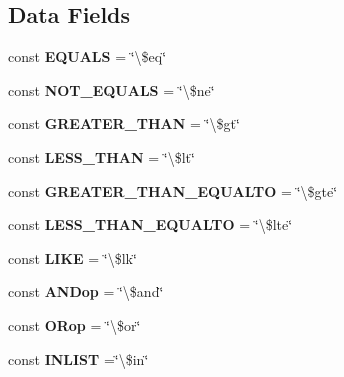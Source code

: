 \subsection*{Data Fields}
\begin{DoxyCompactItemize}
\item 
\hypertarget{class_operator_a008c96da482d1a7b6bd8f24278ba8fc9}{const {\bfseries E\+Q\+U\+A\+L\+S} = \char`\"{}\textbackslash{}\$eq\char`\"{}}\label{class_operator_a008c96da482d1a7b6bd8f24278ba8fc9}

\item 
\hypertarget{class_operator_a88063a320cfcf21a329e1c0d3cd2a8e2}{const {\bfseries N\+O\+T\+\_\+\+E\+Q\+U\+A\+L\+S} = \char`\"{}\textbackslash{}\$ne\char`\"{}}\label{class_operator_a88063a320cfcf21a329e1c0d3cd2a8e2}

\item 
\hypertarget{class_operator_a5285d1fea86cf7d3bbcffd1e66f73271}{const {\bfseries G\+R\+E\+A\+T\+E\+R\+\_\+\+T\+H\+A\+N} = \char`\"{}\textbackslash{}\$gt\char`\"{}}\label{class_operator_a5285d1fea86cf7d3bbcffd1e66f73271}

\item 
\hypertarget{class_operator_a4b23a4a9dc81efd424debd17e25f4107}{const {\bfseries L\+E\+S\+S\+\_\+\+T\+H\+A\+N} = \char`\"{}\textbackslash{}\$lt\char`\"{}}\label{class_operator_a4b23a4a9dc81efd424debd17e25f4107}

\item 
\hypertarget{class_operator_ad641d2c1f0a5b3247ff2929ec19f03dc}{const {\bfseries G\+R\+E\+A\+T\+E\+R\+\_\+\+T\+H\+A\+N\+\_\+\+E\+Q\+U\+A\+L\+T\+O} = \char`\"{}\textbackslash{}\$gte\char`\"{}}\label{class_operator_ad641d2c1f0a5b3247ff2929ec19f03dc}

\item 
\hypertarget{class_operator_a47bd6b3018d113e0d285105c9ce9a4e2}{const {\bfseries L\+E\+S\+S\+\_\+\+T\+H\+A\+N\+\_\+\+E\+Q\+U\+A\+L\+T\+O} = \char`\"{}\textbackslash{}\$lte\char`\"{}}\label{class_operator_a47bd6b3018d113e0d285105c9ce9a4e2}

\item 
\hypertarget{class_operator_ac8337789d23941de413760443df5cad9}{const {\bfseries L\+I\+K\+E} = \char`\"{}\textbackslash{}\$lk\char`\"{}}\label{class_operator_ac8337789d23941de413760443df5cad9}

\item 
\hypertarget{class_operator_af749e4b0a090a866fc6cebc0f958b369}{const {\bfseries A\+N\+Dop} = \char`\"{}\textbackslash{}\$and\char`\"{}}\label{class_operator_af749e4b0a090a866fc6cebc0f958b369}

\item 
\hypertarget{class_operator_ab266987fba1f5b15a9e29d502b57d94c}{const {\bfseries O\+Rop} = \char`\"{}\textbackslash{}\$or\char`\"{}}\label{class_operator_ab266987fba1f5b15a9e29d502b57d94c}

\item 
\hypertarget{class_operator_afbb07031be56c855bf8b185f408c139f}{const {\bfseries I\+N\+L\+I\+S\+T} =\char`\"{}\textbackslash{}\$in\char`\"{}}\label{class_operator_afbb07031be56c855bf8b185f408c139f}

\end{DoxyCompactItemize}
